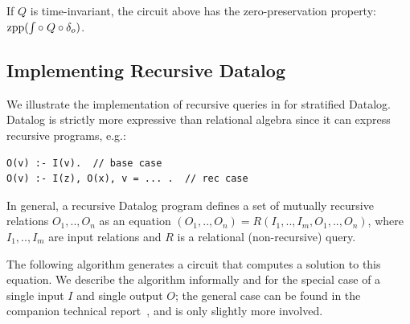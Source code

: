 \begin{proposition}
If $Q$ is time-invariant, the circuit above has the zero-preservation
property: $\mbox{zpp}(\int \circ\; Q \circ \delta_o)$.
\end{proposition}

\subsection{Implementing Recursive Datalog}\label{sec:datalog}

We illustrate the implementation of recursive queries in \dbsp for
stratified Datalog.
Datalog is strictly more expressive than
relational algebra since it can express recursive programs, e.g.:
{\small
\begin{lstlisting}[language=ddlog]
O(v) :- I(v).  // base case
O(v) :- I(z), O(x), v = ... .  // rec case
\end{lstlisting}
}
In general, a recursive Datalog program defines a set of
mutually recursive relations $O_1,..,O_n$ as an equation
$(O_1,..,O_n)=R(I_1,..,I_m, O_1,..,O_n)$, where $I_1,..,I_m$ are
input relations and $R$ is a relational (non-recursive) query.

The following algorithm generates a circuit that computes a
solution to this equation.  We describe the algorithm informally and 
for the special case of a single input $I$ and single output $O$; the general case
can be found in the companion technical report~\cite{tr}, and is only 
slightly more involved.

